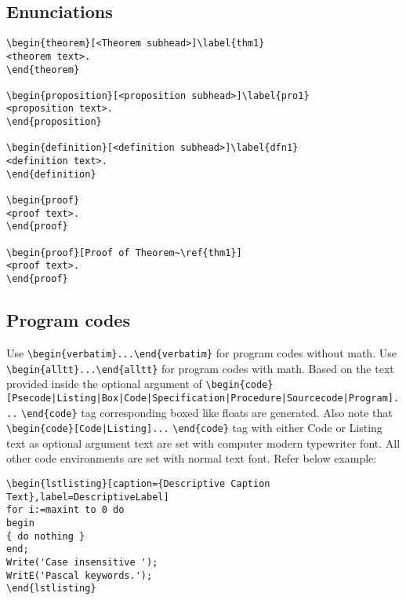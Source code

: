 \documentclass[AMS,STIX1COL]{WileyNJD-v2}
\begin{document}
\subsection{Enunciations}

\begin{verbatim}
\begin{theorem}[<Theorem subhead>]\label{thm1}
<theorem text>. 
\end{theorem}

\begin{proposition}[<proposition subhead>]\label{pro1}
<proposition text>. 
\end{proposition}

\begin{definition}[<definition subhead>]\label{dfn1}
<definition text>. 
\end{definition}

\begin{proof}
<proof text>. 
\end{proof}

\begin{proof}[Proof of Theorem~\ref{thm1}]
<proof text>.
\end{proof}

\end{verbatim}

\subsection{Program codes}

Use \verb+\begin{verbatim}...\end{verbatim}+ for program codes without math. Use \verb+\begin{alltt}...\end{alltt}+ for program codes with math. Based on the text provided inside the optional argument of \verb+\begin{code}[Psecode|Listing|Box|Code|+\hfill\break \verb+Specification|Procedure|Sourcecode|Program]...+ \verb+\end{code}+ tag corresponding boxed like floats are generated. Also note that \verb+\begin{code}[Code|Listing]...+ \verb+\end{code}+ tag with either Code or Listing text as optional argument text are set with computer modern typewriter font.  All other code environments are set with normal text font. Refer below example:

\begin{verbatim}
\begin{lstlisting}[caption={Descriptive Caption Text},label=DescriptiveLabel]
for i:=maxint to 0 do
begin
{ do nothing }
end;
Write('Case insensitive ');
WritE('Pascal keywords.');
\end{lstlisting}
\end{verbatim}
\end{document}
